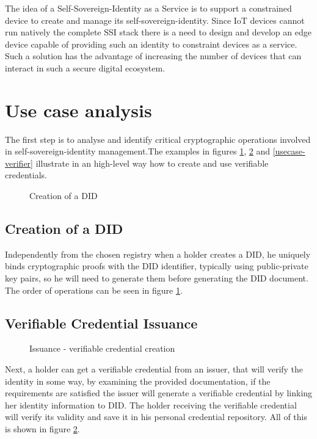 
The idea of a Self-Sovereign-Identity as a Service is to support a constrained device to create and manage its self-sovereign-identity. Since IoT devices cannot run natively the complete SSI stack there is a need to design and develop an edge device capable of providing such an identity to constraint devices as a service.  Such a solution has the advantage of increasing the number of devices that can interact in such a secure digital ecosystem.

\section{Use case analysis}
The first step is to analyse and identify critical cryptographic operations involved in self-sovereign-identity management.The examples in figures \ref{usecase-did}, \ref{usecase-issuer} and \ref{usecase-verifier} illustrate in an high-level way how to create and use verifiable credentials. 
\begin{figure}[!h]
    \centering
    
    \caption{Creation of a DID}
    \label{usecase-did}
\end{figure}

\subsection{Creation of a DID}
Independently from the chosen registry when a holder creates a DID, he uniquely binds cryptographic proofs with the DID identifier, typically using public-private key pairs, so he will need to generate them before generating the DID document. The order of operations can be seen in figure \ref{usecase-did}. 
\subsection{Verifiable Credential Issuance}
\begin{figure}[!h]
    \centering
    
    \caption{Issuance - verifiable credential creation}
    \label{usecase-issuer}
\end{figure}
Next, a holder can get a verifiable credential from an issuer, that will verify the identity in some way, by examining the provided documentation, if the requirements are satisfied the issuer will generate a verifiable credential by linking her identity information to DID. The holder receiving the verifiable credential will verify its validity and save it in his personal credential repository. All of this is shown in figure \ref{usecase-issuer}. 
